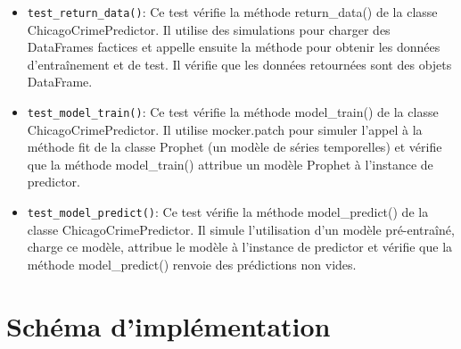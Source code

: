\documentclass[12pt]{article}
\begin{document}
\begin{enumerate}
\begin{itemize}
		\item \texttt{test\_return\_data()}: Ce test vérifie la méthode return\_data() de la classe ChicagoCrimePredictor. Il utilise des simulations pour charger des DataFrames factices et appelle ensuite la méthode pour obtenir les données d'entraînement et de test. Il vérifie que les données retournées sont des objets DataFrame.
		
		\item \texttt{test\_model\_train()}: Ce test vérifie la méthode model\_train() de la classe ChicagoCrimePredictor. Il utilise mocker.patch pour simuler l'appel à la méthode fit de la classe Prophet (un modèle de séries temporelles) et vérifie que la méthode model\_train() attribue un modèle Prophet à l'instance de predictor.
		
		\item \texttt{test\_model\_predict()}: Ce test vérifie la méthode model\_predict() de la classe ChicagoCrimePredictor. Il simule l'utilisation d'un modèle pré-entraîné, charge ce modèle, attribue le modèle à l'instance de predictor et vérifie que la méthode model\_predict() renvoie des prédictions non vides.
	\end{itemize}
\end{enumerate}


\section{Schéma d’implémentation}
\end{document}

